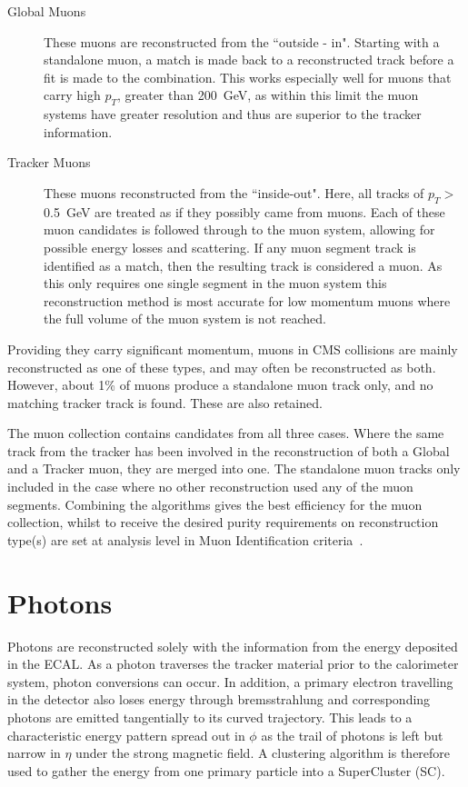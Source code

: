 \begin{description}
\item[Global Muons]{These muons are reconstructed from the ``outside - in". Starting with a standalone muon, a match is made back to a reconstructed track before a fit is made to the combination. This works especially well for muons that carry high $p_{T}$, greater than 200~GeV, as within this limit the muon systems have greater resolution and thus are superior to the tracker information.}
\item[Tracker Muons]{These muons reconstructed from the ``inside-out". Here, all tracks of $p_{T} >$ 0.5~GeV are treated as if they possibly came from muons. Each of these muon candidates is followed through to the muon system, allowing for possible energy losses and scattering.  If any muon segment track is identified as a match, then the resulting track is considered a muon. As this only requires one single segment in the muon system this reconstruction method is most accurate for low momentum muons where the full volume of the muon system is not reached.}

\end{description}

Providing they carry significant momentum, muons in CMS collisions are mainly reconstructed as one of these types, and may often be reconstructed as both. However, about 1\% of muons produce a standalone muon track only, and no matching tracker track is found. These are also retained. 

The muon collection contains candidates from all three cases. Where the same track from the tracker has been involved in the reconstruction of both a Global and a Tracker muon, they are merged into one.  The standalone muon tracks only included in the case where no other reconstruction used any of the muon segments. Combining the algorithms gives the best efficiency for the muon collection, whilst to receive the desired purity requirements on reconstruction type(s) are set at analysis level in Muon Identification criteria~\cite{MUO-10-004}. 

\section{Photons}

Photons are reconstructed solely with the information from the energy deposited in the ECAL. As a photon traverses the tracker material prior to the calorimeter system, photon conversions can occur.  In addition, a primary electron travelling in the detector also loses energy through bremsstrahlung and corresponding photons are emitted tangentially to its curved trajectory. This leads to a characteristic energy pattern spread out in $\phi$ as the trail of photons is left but narrow in $\eta$ under the strong magnetic field. A clustering algorithm is therefore used to gather the energy from one primary particle into a SuperCluster (SC).

